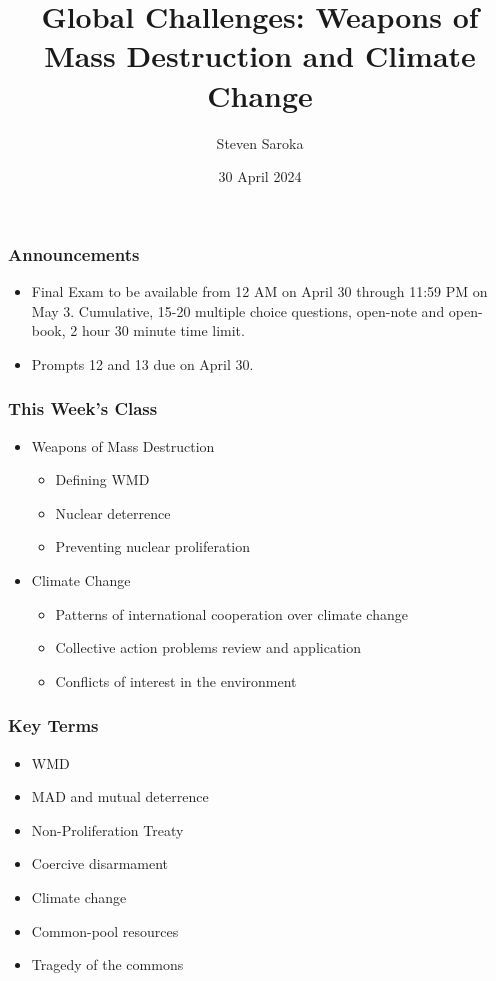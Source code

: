 \documentclass[handout]{beamer}
\title[Global Challenges]{\LARGE{Global Challenges: Weapons of Mass Destruction and Climate Change}}
\author[POLI 150]{Steven Saroka}
\institute{POLI 150}
\date{30 April 2024}
\begin{document}
\begin{frame}
\titlepage %
\end{frame}



\begin{frame} 
	\frametitle{\LARGE{Announcements}}
	\begin{itemize}
		\item Final Exam to be available from 12 AM on April 30 through 11:59 PM on May 3. Cumulative, 15-20 multiple choice questions, open-note and open-book, 2 hour 30 minute time limit.
		\item Prompts 12 and 13 due on April 30.
	\end{itemize}
\end{frame}

\begin{frame} 
	\frametitle{\LARGE{This Week's Class}}
	\begin{itemize}
		\item Weapons of Mass Destruction
			\begin{itemize}
			\item Defining WMD

			\item Nuclear deterrence

			\item Preventing nuclear proliferation 
			\end{itemize}
		\item Climate Change
			\begin{itemize}
			\item Patterns of international cooperation over climate change  
			
			\item Collective action problems review and application 
			
			\item Conflicts of interest in the environment 
		\end{itemize}
	\end{itemize}
\end{frame}


\begin{frame} 
	\frametitle{\LARGE{Key Terms}}
	\begin{itemize}
		\item WMD 
		\item MAD and mutual deterrence
		\item Non-Proliferation Treaty
		\item Coercive disarmament
		\item Climate change
		\item Common-pool resources
		\item Tragedy of the commons
		
	\end{itemize}
\end{frame}
\end{document}
